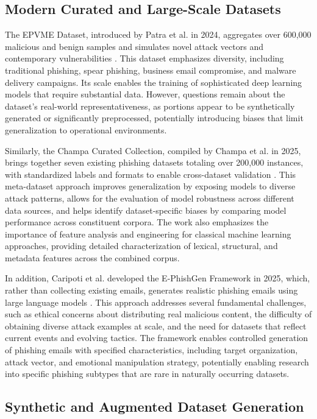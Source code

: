 \subsection{Modern Curated and Large-Scale Datasets}

The EPVME Dataset, introduced by Patra et al. in 2024, aggregates over 600,000 malicious and benign samples and simulates novel attack vectors and contemporary vulnerabilities \cite{zhang2025maliciousemail}. This dataset emphasizes diversity, including traditional phishing, spear phishing, business email compromise, and malware delivery campaigns. Its scale enables the training of sophisticated deep learning models that require substantial data. However, questions remain about the dataset's real-world representativeness, as portions appear to be synthetically generated or significantly preprocessed, potentially introducing biases that limit generalization to operational environments.

Similarly, the Champa Curated Collection, compiled by Champa et al. in 2025, brings together seven existing phishing datasets totaling over 200,000 instances, with standardized labels and formats to enable cross-dataset validation \cite{champa2024curated}. This meta-dataset approach improves generalization by exposing models to diverse attack patterns, allows for the evaluation of model robustness across different data sources, and helps identify dataset-specific biases by comparing model performance across constituent corpora. The work also emphasizes the importance of feature analysis and engineering for classical machine learning approaches, providing detailed characterization of lexical, structural, and metadata features across the combined corpus.

In addition, Caripoti et al. developed the E-PhishGen Framework in 2025, which, rather than collecting existing emails, generates realistic phishing emails using large language models \cite{caripoti2025ephishgen}. This approach addresses several fundamental challenges, such as ethical concerns about distributing real malicious content, the difficulty of obtaining diverse attack examples at scale, and the need for datasets that reflect current events and evolving tactics. The framework enables controlled generation of phishing emails with specified characteristics, including target organization, attack vector, and emotional manipulation strategy, potentially enabling research into specific phishing subtypes that are rare in naturally occurring datasets.

\subsection{Synthetic and Augmented Dataset Generation}

